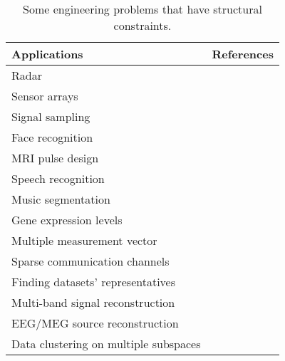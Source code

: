 \begin{table}[!bp]
\begin{adjustbox}{width=1\textwidth} %
\centering
\begin{tabular}{cc}
\toprule
\multicolumn{1}{l}{Applications} & \multicolumn{1}{c}{References} \\ \midrule %
\multicolumn{1}{l}{Radar} & \multicolumn{1}{l}{\cite{Model2006}} \\
\multicolumn{1}{l}{Sensor arrays} & \multicolumn{1}{l}{\cite{Malioutov2005}} \\
\multicolumn{1}{l}{Signal sampling} & \multicolumn{1}{l}{\cite{Casazza2004,Lu2008a,Blumensath2009,Mishali2009,Eldar2009a,Mishali2010,Gedalyahu2010}}
\\
\multicolumn{1}{l}{Face recognition} & \multicolumn{1}{l}{\cite{Wright2009a,Elhamifar2011,Elhamifar2012b,Peng2015}} \\
\multicolumn{1}{l}{MRI pulse design} & \multicolumn{1}{l}{\cite{Zelinski2008,Zelinski2008a}} \\
\multicolumn{1}{l}{Speech recognition} & \multicolumn{1}{l}{\cite{Gemmeke2008,Gemmeke2008a}} \\
\multicolumn{1}{l}{Music segmentation} & \multicolumn{1}{l}{\cite{Krstulovic2005,Daudet2006,Keriven2013}} \\
\multicolumn{1}{l}{Gene expression levels} & \multicolumn{1}{l}{\cite{Erickson2005,Parvaresh2008a}} \\
\multicolumn{1}{l}{Multiple measurement vector} & \multicolumn{1}{l}{\cite{Cotter2005,Chen2006,Mishali2008,Fornasier2008,Berg2010,Eldar2010a,Lai2011,Ling2013}}
\\
\multicolumn{1}{l}{Sparse communication channels} & \multicolumn{1}{l}{\cite{Cotter2002}} \\
\multicolumn{1}{l}{Finding datasets' representatives} & \multicolumn{1}{l}{\cite{Elhamifar2012c}} \\
\multicolumn{1}{l}{Multi-band signal reconstruction} & \multicolumn{1}{l}{\cite{Landau1967,Mishali2009,Mishali2011a,Mishali2010}} \\
\multicolumn{1}{l}{EEG/MEG source reconstruction} & \multicolumn{1}{l}{\cite{Gorodnitsky1995}} \\
\multicolumn{1}{l}{Data clustering on multiple subspaces} & \multicolumn{1}{l}{\cite{Elhamifar2009,Elhamifar2010,Elhamifar2013}}
  \\\bottomrule %
\end{tabular}
\end{adjustbox}
\caption{Some engineering problems that have structural constraints.}
\label{table:Block-sparsity_applications}
\end{table}